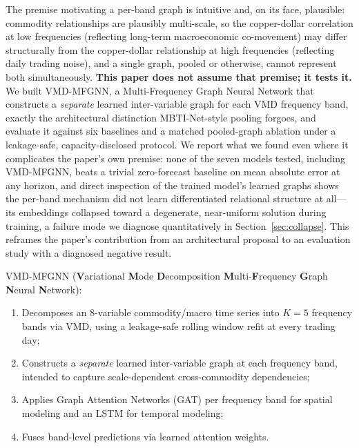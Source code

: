 \documentclass[journal]{IEEEtran}
\begin{document}
The premise motivating a per-band graph is intuitive and, on its face, plausible: commodity relationships are plausibly multi-scale, so the copper-dollar correlation at low frequencies (reflecting long-term macroeconomic co-movement) may differ structurally from the copper-dollar relationship at high frequencies (reflecting daily trading noise), and a single graph, pooled or otherwise, cannot represent both simultaneously. \textbf{This paper does not assume that premise; it tests it.} We built VMD-MFGNN, a Multi-Frequency Graph Neural Network that constructs a \emph{separate} learned inter-variable graph for each VMD frequency band, exactly the architectural distinction MBTI-Net-style pooling forgoes, and evaluate it against six baselines and a matched pooled-graph ablation under a leakage-safe, capacity-disclosed protocol. We report what we found even where it complicates the paper's own premise: none of the seven models tested, including VMD-MFGNN, beats a trivial zero-forecast baseline on mean absolute error at any horizon, and direct inspection of the trained model's learned graphs shows the per-band mechanism did not learn differentiated relational structure at all---its embeddings collapsed toward a degenerate, near-uniform solution during training, a failure mode we diagnose quantitatively in Section~\ref{sec:collapse}. This reframes the paper's contribution from an architectural proposal to an evaluation study with a diagnosed negative result.

VMD-MFGNN (\textbf{V}ariational \textbf{M}ode \textbf{D}ecomposition \textbf{M}ulti-\textbf{F}requency \textbf{G}raph \textbf{N}eural \textbf{N}etwork):

\begin{enumerate}
    \item Decomposes an 8-variable commodity/macro time series into $K=5$ frequency bands via VMD, using a leakage-safe rolling window refit at every trading day;
    \item Constructs a \emph{separate} learned inter-variable graph at each frequency band, intended to capture scale-dependent cross-commodity dependencies;
    \item Applies Graph Attention Networks (GAT) per frequency band for spatial modeling and an LSTM for temporal modeling;
    \item Fuses band-level predictions via learned attention weights.
\end{enumerate}
\end{document}
